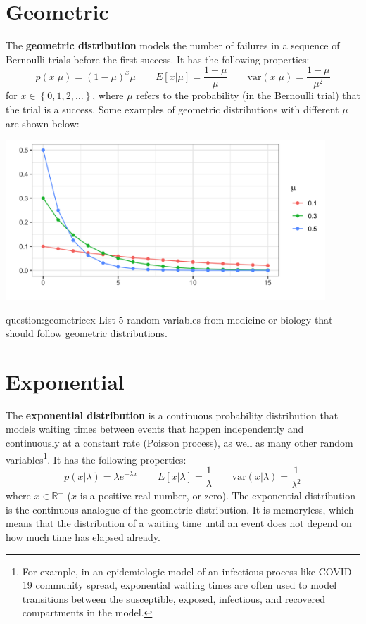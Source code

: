 \section{Geometric \label{sect:geometric}}

The \textbf{geometric distribution} models the number of failures in a sequence of Bernoulli trials before the first success. It has the following properties:
$$ p(x|\mu) = (1-\mu)^x \mu \qquad E[x|\mu] = \frac{1-\mu}{\mu} \qquad \text{var}(x|\mu) = \frac{1-\mu}{\mu^2}  $$
for $x \in \left\{0, 1, 2, \dots \right\}$, where $\mu$ refers to the probability (in the Bernoulli trial) that the trial is a success. Some examples of geometric distributions with different $\mu$ are shown below: 
\begin{center}
\includegraphics[width=0.9\textwidth]{img/l01-figure4-geometric-mu-change.png}
\end{center}

\begin{question}{question:geometricex}
List 5 random variables from medicine or biology that should follow geometric distributions.
\end{question}


\section{Exponential \label{sect:exponential}}

The \textbf{exponential distribution} is a continuous probability distribution that models waiting times between events that happen independently and continuously at a constant rate (Poisson process), as well as many other random variables\footnote{For example, in an epidemiologic model of an infectious process like COVID-19 community spread, exponential waiting times are often used to model transitions between the susceptible, exposed, infectious, and recovered compartments in the model.}. It has the following properties:
$$ p(x|\lambda) = \lambda e^{-\lambda x} \qquad E[x|\lambda] = \frac{1}{\lambda} \qquad \text{var}(x|\lambda) = \frac{1}{\lambda^2} $$
where $x \in \mathbb{R}^+$ ($x$ is a positive real number, or zero). The exponential distribution is the continuous analogue of the geometric distribution. It is memoryless, which means that the distribution of a waiting time until an event does not depend on how much time has elapsed already.


